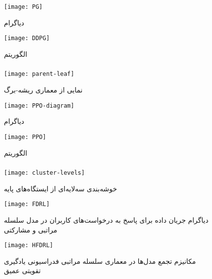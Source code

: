 \begin{figure}[ht]
	\centerline{\texttt{[image: PG]}}
	\caption{دیاگرام }
	\label{fig:PG}
\end{figure}

\begin{figure}[ht]
	\centerline{\texttt{[image: DDPG]}}
	\caption{الگوریتم }
	\label{fig:DDPG}
\end{figure}

\subsubsection{}


\begin{figure}[ht]
	\centerline{\texttt{[image: parent-leaf]}}
	\caption{نمایی از معماری ریشه-برگ}
	\label{fig:parent-leaf}
\end{figure}

\begin{figure}[ht]
	\centerline{\texttt{[image: PPO-diagram]}}
	\caption{دیاگرام }
	\label{fig:ppod}
\end{figure}

\begin{figure}[ht]
	\centerline{\texttt{[image: PPO]}}
	\caption{الگوریتم }
	\label{fig:ppo}
\end{figure}

\subsubsection{}


\begin{figure}[ht]
	\centerline{\texttt{[image: cluster-levels]}}
	\caption{خوشه‌بندی سه‌لایه‌ای از ایستگاه‌های پایه}
	\label{fig:cluster-levels}
\end{figure}

\begin{figure}[ht]
	\centerline{\texttt{[image: FDRL]}}
	\caption{دیاگرام جریان داده برای پاسخ به درخواست‌های کاربران در مدل سلسله مراتبی و مشارکتی}
	\label{fig:fdrl}
\end{figure}

\begin{figure}[ht]
	\centerline{\texttt{[image: HFDRL]}}
	\caption{مکانیزم تجمع مدل‌ها در معماری سلسله مراتبی فدراسیونی یادگیری تقویتی عمیق}
	\label{fig:hfdrl}
\end{figure}

